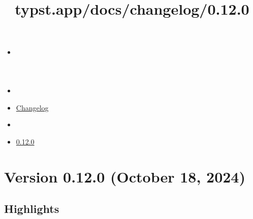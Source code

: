 \title{typst.app/docs/changelog/0.12.0}

\begin{itemize}
\tightlist
\item
  \href{/docs}{}
\item
  
\item
  \href{/docs/changelog/}{Changelog}
\item
  
\item
  \href{/docs/changelog/0.12.0/}{0.12.0}
\end{itemize}

\section{Version 0.12.0 (October 18,
2024)}\label{version-0.12.0-october-18-2024}

\subsection{Highlights}\label{highlights}

